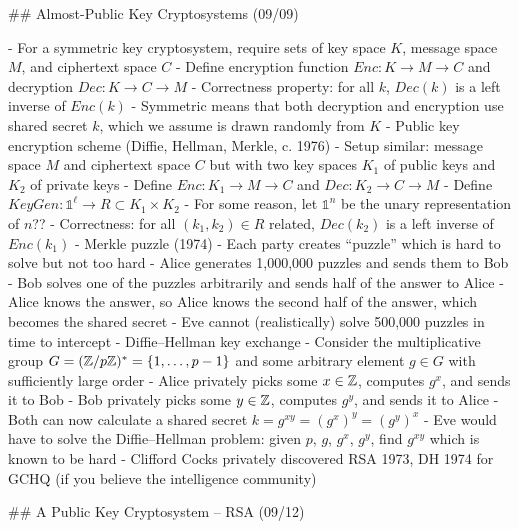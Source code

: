 \documentclass[notes]{agony}
\begin{document}
\begin{markdown}
## Almost-Public Key Cryptosystems (09/09)

- For a symmetric key cryptosystem, require sets of key space $K$, message space $M$, and ciphertext space $C$
    - Define encryption function $Enc : K \to M \to C$ and decryption $Dec : K \to C \to M$
    - Correctness property: for all $k$, $Dec(k)$ is a left inverse of $Enc(k)$
    - Symmetric means that both decryption and encryption use shared secret $k$, which we assume is drawn randomly from $K$
- Public key encryption scheme (Diffie, Hellman, Merkle, c. 1976)
    - Setup similar: message space $M$ and ciphertext space $C$ but with two key spaces $K_1$ of public keys and $K_2$ of private keys
    - Define $Enc : K_1 \to M \to C$ and $Dec : K_2 \to C \to M$
    - Define $KeyGen : \mathbb{1}^\ell \to R \subset K_1 \times K_2$
        - For some reason, let $\mathbb{1}^n$ be the unary representation of $n$??
    - Correctness: for all $(k_1,k_2) \in R$ related, $Dec(k_2)$ is a left inverse of $Enc(k_1)$
- Merkle puzzle (1974) 
    - Each party creates ``puzzle'' which is hard to solve but not too hard
    - Alice generates 1,000,000 puzzles and sends them to Bob
    - Bob solves one of the puzzles arbitrarily and sends half of the answer to Alice
    - Alice knows the answer, so Alice knows the second half of the answer, which becomes the shared secret
    - Eve cannot (realistically) solve 500,000 puzzles in time to intercept
- Diffie--Hellman key exchange
    - Consider the multiplicative group $G = (\mathbb{Z} / p\mathbb{Z})^* = \{1,\dotsc,p-1\}$ and some arbitrary element $g \in G$ with sufficiently large order
    - Alice privately picks some $x \in \mathbb{Z}$, computes $g^x$, and sends it to Bob
    - Bob privately picks some $y \in \mathbb{Z}$, computes $g^y$, and sends it to Alice
    - Both can now calculate a shared secret $k = g^{xy} = (g^x)^y = (g^y)^x$
    - Eve would have to solve the Diffie--Hellman problem: given $p$, $g$, $g^x$, $g^y$, find $g^{xy}$ which is known to be hard
- Clifford Cocks privately discovered RSA 1973, DH 1974 for GCHQ (if you believe the intelligence community)

## A Public Key Cryptosystem -- RSA (09/12)


\end{markdown}
\end{document}
